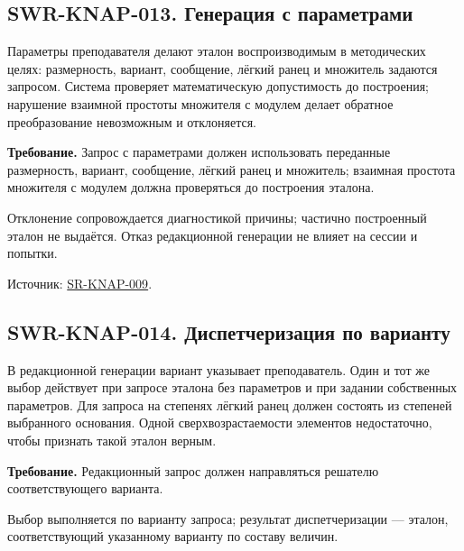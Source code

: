 \documentclass[12pt,a4paper]{article}
\begin{document}
\subsection{SWR-KNAP-013. Генерация с параметрами}\label{swr-knap-013-ux433ux435ux43dux435ux440ux430ux446ux438ux44f-ux441-ux43fux430ux440ux430ux43cux435ux442ux440ux430ux43cux438}

\hypertarget{swr-knap-013-генерация-с-параметрами}{}

\hypertarget{swr-knap-013}{}

Параметры преподавателя делают эталон воспроизводимым в методических целях: размерность, вариант, сообщение, лёгкий ранец и множитель задаются запросом. Система проверяет математическую допустимость до построения; нарушение взаимной простоты множителя с модулем делает обратное преобразование невозможным и отклоняется.

\textbf{Требование.} Запрос с параметрами должен использовать переданные размерность, вариант, сообщение, лёгкий ранец и множитель; взаимная простота множителя с модулем должна проверяться до построения эталона.

Отклонение сопровождается диагностикой причины; частично построенный эталон не выдаётся. Отказ редакционной генерации не влияет на сессии и попытки.

Источник: {\href{../04\_Системные\_требования/DOC-05\_Системные\_требования.pdf\#sr-knap-009}{SR-KNAP-009}}.

\subsection{SWR-KNAP-014. Диспетчеризация по варианту}\label{swr-knap-014-ux434ux438ux441ux43fux435ux442ux447ux435ux440ux438ux437ux430ux446ux438ux44f-ux43fux43e-ux432ux430ux440ux438ux430ux43dux442ux443}

\hypertarget{swr-knap-014-диспетчеризация-по-варианту}{}

\hypertarget{swr-knap-014}{}

В редакционной генерации вариант указывает преподаватель. Один и тот же выбор действует при запросе эталона без параметров и при задании собственных параметров. Для запроса на степенях лёгкий ранец должен состоять из степеней выбранного основания. Одной сверхвозрастаемости элементов недостаточно, чтобы признать такой эталон верным.

\textbf{Требование.} Редакционный запрос должен направляться решателю соответствующего варианта.

Выбор выполняется по варианту запроса; результат диспетчеризации --- эталон, соответствующий указанному варианту по составу величин.
\end{document}
